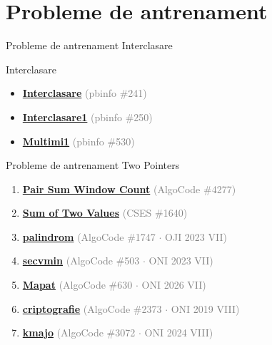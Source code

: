 ﻿\documentclass{beamer}
\begin{document}
\section{Probleme de antrenament}

\begin{frame}{Probleme de antrenament \textemdash{} Interclasare}
  \begin{block}{Interclasare}
    \begin{itemize}\footnotesize\itemsep0pt
      \item \href{https://www.pbinfo.ro/probleme/241/interclasare}{\textbf{Interclasare}} \textcolor{gray}{(pbinfo \#241)}
      \item \href{https://www.pbinfo.ro/probleme/250/interclasare1}{\textbf{Interclasare1}} \textcolor{gray}{(pbinfo \#250)}
      \item \href{https://www.pbinfo.ro/probleme/530/multimi1}{\textbf{Multimi1}} \textcolor{gray}{(pbinfo \#530)}
    \end{itemize}
  \end{block}
\end{frame}

\begin{frame}{Probleme de antrenament \textemdash{} Two Pointers}
  \begin{enumerate}\footnotesize\itemsep2pt
    \item \href{https://code.algolymp.com/problems/4277}{\textbf{Pair Sum Window Count}}
          \textcolor{gray}{(AlgoCode \#4277)}
    \item \href{https://cses.fi/problemset/task/1640}{\textbf{Sum of Two Values}}
          \textcolor{gray}{(CSES \#1640)}
    \item \href{https://code.algolymp.com/problems/1747}{\textbf{palindrom}}
          \textcolor{gray}{(AlgoCode \#1747 $\cdot$ OJI 2023 VII)}
    \item \href{https://code.algolymp.com/problems/503}{\textbf{secvmin}}
          \textcolor{gray}{(AlgoCode \#503 $\cdot$ ONI 2023 VII)}
    \item \href{https://code.algolymp.com/problems/630}{\textbf{Mapat}}
          \textcolor{gray}{(AlgoCode \#630 $\cdot$ ONI 2026 VII)}
    \item \href{https://code.algolymp.com/problems/2373}{\textbf{criptografie}}
          \textcolor{gray}{(AlgoCode \#2373 $\cdot$ ONI 2019 VIII)}
    \item \href{https://code.algolymp.com/problems/3072}{\textbf{kmajo}}
          \textcolor{gray}{(AlgoCode \#3072 $\cdot$ ONI 2024 VIII)}
  \end{enumerate}
\end{frame}
\end{document}
